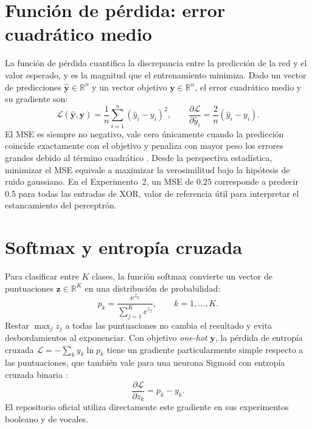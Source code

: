 \section{Función de pérdida: error cuadrático medio}
La función de pérdida cuantifica la discrepancia entre la predicción de la red y el valor esperado, y es la magnitud que el entrenamiento minimiza. Dado un vector de predicciones $\hat{\mathbf{y}}\in\mathbb{R}^{n}$ y un vector objetivo $\mathbf{y}\in\mathbb{R}^{n}$, el error cuadrático medio y su gradiente son:
\begin{equation}
\mathcal{L}(\hat{\mathbf{y}},\mathbf{y}) = \frac{1}{n}\sum_{i=1}^{n}(\hat{y}_i - y_i)^2, \qquad \frac{\partial\mathcal{L}}{\partial \hat{y}_i} = \frac{2}{n}(\hat{y}_i - y_i).\label{eq:mse}
\end{equation}
El MSE es siempre no negativo, vale cero únicamente cuando la predicción coincide exactamente con el objetivo y penaliza con mayor peso los errores grandes debido al término cuadrático \citep{bishop2006}. Desde la perspectiva estadística, minimizar el MSE equivale a maximizar la verosimilitud bajo la hipótesis de ruido gaussiano. En el Experimento~2, un MSE de $0.25$ corresponde a predecir $0.5$ para todas las entradas de XOR, valor de referencia útil para interpretar el estancamiento del perceptrón.

\section{Softmax y entropía cruzada}
Para clasificar entre $K$ clases, la función softmax convierte un vector de puntuaciones $\mathbf{z}\in\mathbb{R}^{K}$ en una distribución de probabilidad:
\begin{equation}
p_k = \frac{e^{z_k}}{\sum_{j=1}^{K} e^{z_j}}, \qquad k = 1,\dots,K.\label{eq:softmax}
\end{equation}
Restar $\max_j z_j$ a todas las puntuaciones no cambia el resultado y evita desbordamientos al exponenciar. Con objetivo \emph{one-hot} $\mathbf{y}$, la pérdida de entropía cruzada $\mathcal{L} = -\sum_k y_k \ln p_k$ tiene un gradiente particularmente simple respecto a las puntuaciones, que también vale para una neurona Sigmoid con entropía cruzada binaria \citep{bishop2006,goodfellow2016}:
\begin{equation}
\frac{\partial\mathcal{L}}{\partial z_k} = p_k - y_k.\label{eq:ce}
\end{equation}
El repositorio oficial utiliza directamente este gradiente en sus experimentos booleano y de vocales.

